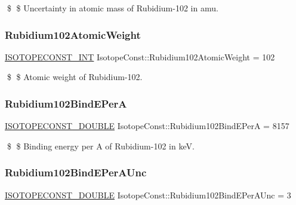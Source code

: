 \$ \$ Uncertainty in atomic mass of Rubidium-\/102 in amu. \mbox{\label{group___isotope_const-_rubidium-_rb102_ga27488360ab1decec5e6429b43548e9d0}} 
\subsubsection{\texorpdfstring{Rubidium102\+Atomic\+Weight}{Rubidium102AtomicWeight}}
{\footnotesize\ttfamily \mbox{\hyperlink{group___isotope_const-_macros_ga5f18360b3e99483a35c32d789e62621c}{I\+S\+O\+T\+O\+P\+E\+C\+O\+N\+S\+T\+\_\+\+I\+NT}} Isotope\+Const\+::\+Rubidium102\+Atomic\+Weight = 102}

\$ \$ Atomic weight of Rubidium-\/102. \mbox{\label{group___isotope_const-_rubidium-_rb102_ga9c94b272dc60318ce7318634dd0df015}} 
\subsubsection{\texorpdfstring{Rubidium102\+Bind\+E\+PerA}{Rubidium102BindEPerA}}
{\footnotesize\ttfamily \mbox{\hyperlink{group___isotope_const-_macros_ga8f45a7272ce02c0b4c65c44636ed719a}{I\+S\+O\+T\+O\+P\+E\+C\+O\+N\+S\+T\+\_\+\+D\+O\+U\+B\+LE}} Isotope\+Const\+::\+Rubidium102\+Bind\+E\+PerA = 8157}

\$ \$ Binding energy per A of Rubidium-\/102 in keV. \mbox{\label{group___isotope_const-_rubidium-_rb102_ga677798cd7887cad48c0eef2c04608328}} 
\subsubsection{\texorpdfstring{Rubidium102\+Bind\+E\+Per\+A\+Unc}{Rubidium102BindEPerAUnc}}
{\footnotesize\ttfamily \mbox{\hyperlink{group___isotope_const-_macros_ga8f45a7272ce02c0b4c65c44636ed719a}{I\+S\+O\+T\+O\+P\+E\+C\+O\+N\+S\+T\+\_\+\+D\+O\+U\+B\+LE}} Isotope\+Const\+::\+Rubidium102\+Bind\+E\+Per\+A\+Unc = 3}

